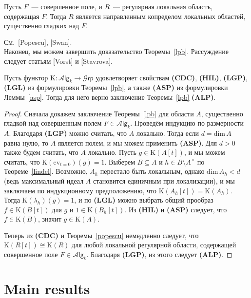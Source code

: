 \documentclass[oneside, 11pt]{amsart}
\begin{document}
\begin{theorem}[Popescu]
\label{popescu}
Пусть $F$~--- совершенное поле, и $R$~--- регулярная локальная область, содержащая $F$. Тогда $R$ является направленным копределом локальных областей, существенно гладких над $F$.
\end{theorem}
См.~[Popescu], [Swan].\\

Наконец, мы можем завершить доказательство Теоремы~\ref{lpb}. Рассуждение следует статьям [Vorst] и [Stavrova].

\begin{lemma}
Пусть функтор $\mathrm K\colon\mathcal A\mathsf{lg}_k\rightarrow\mathcal G\mathsf{rp}$ удовлетворяет свойствам {\bf(CDC)}, {\bf(HIL)}, {\bf(LGP)}, {\bf(LGL)} из формулировки Теоремы~\ref{lpb}, а также {\bf(ASP)} из формулировки Леммы~\ref{asp}. Тогда для него верно заключение Теоремы~\ref{lpb} {\bf(ALP)}. 
\end{lemma}
\begin{proof}
Сначала докажем заключение Теоремы~\ref{lpb} для области $A$, существенно гладкой над совершенным полем $F\in\mathcal A\mathsf{lg}_k$. Проведём индукцию по размерности $A$. Благодаря {\bf(LGP)} можно считать, что $A$ локально. Тогда если $d=\mathrm{dim}\,A$ равна нулю, то $A$ является полем, и мы можем применить {\bf(ASP)}. Для $d>0$ также будем считать, что $A$ локально. Пусть $g\in\mathrm K(A[t])$, и мы можем считать, что $\mathrm K(\mathrm{ev}_{t=0})(g)=1$. Выберем $B\subseteq A$ и $h\in B\setminus A^\times$ по Теореме~\ref{lindel}. Возможно, $A_h$ перестало быть локальным, однако $\mathrm{dim}\,A_h<d$ (ведь максимальный идеал $A$ становится единичным при локализации), и мы заключаем по индукционному предположению, что $\mathrm K(A_h[t])=\mathrm K(A_h)$. Тогда $\mathrm K(\lambda_h)(g)=1$, и по {\bf(LGL)} можно выбрать общий прообраз $f\in\mathrm K(B[t])$ для $g$ и $1\in\mathrm K(B_h[t])$. Из {\bf(HIL)} и {\bf(ASP)} следует, что $f\in\mathrm K(B)$, значит $g\in\mathrm K(A)$.

Теперь из {\bf(CDC)} и Теоремы~\ref{popescu} немедленно следует, что $\mathrm K(R[t])\cong\mathrm K(R)$ для любой локальной регулярной области, содержащей совершенное поле $F\in\mathcal A\mathsf{lg}_k$. Благодаря {\bf(LGP)}, из этого следует {\bf(ALP)}.
\end{proof}

\section{Main results}
\end{document}

